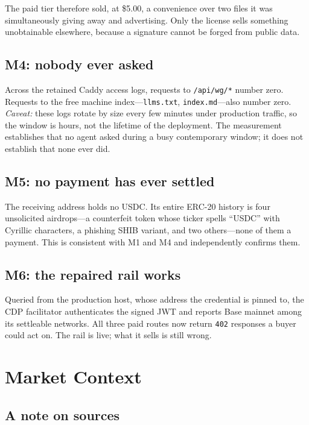 \documentclass[10pt,letterpaper,twocolumn]{article}
\newcommand{\code}[1]{\texttt{#1}}
\begin{document}
The paid tier therefore sold, at \$5.00, a convenience over two files it was
simultaneously giving away and advertising. Only the license sells something
unobtainable elsewhere, because a signature cannot be forged from public data.

\subsection{M4: nobody ever asked}

Across the retained Caddy access logs, requests to \code{/api/wg/*} number
zero. Requests to the free machine index---\code{llms.txt},
\code{index.md}---also number zero. \emph{Caveat:} these logs rotate by size
every few minutes under production traffic, so the window is hours, not the
lifetime of the deployment. The measurement establishes that no agent asked
during a busy contemporary window; it does not establish that none ever did.

\subsection{M5: no payment has ever settled}

The receiving address holds no USDC. Its entire ERC-20 history is four
unsolicited airdrops---a counterfeit token whose ticker spells ``USDC'' with
Cyrillic characters, a phishing SHIB variant, and two others---none of them a
payment. This is consistent with M1 and M4 and independently confirms them.

\subsection{M6: the repaired rail works}

Queried from the production host, whose address the credential is pinned to,
the CDP facilitator authenticates the signed JWT and reports Base mainnet
among its settleable networks. All three paid routes now return \code{402}
responses a buyer could act on. The rail is live; what it sells is still
wrong.

\section{Market Context}
\label{sec:market}

\subsection{A note on sources}
\end{document}
